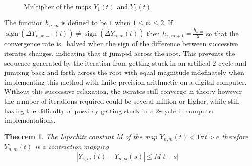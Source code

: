 \documentclass{article}
\newcommand{\tmop}[1]{\ensuremath{\operatorname{#1}}}
\newtheorem{theorem}{Theorem}
\begin{document}
\

\begin{figure}[h]
  \caption{Multiplier of the maps $Y_1 (t)$ and $Y_3 (t)$}
\end{figure}

\begin{remark}
  The function $h_{n, m}$ is defined to be $1$ when $1 \leqslant m \leqslant
  2$. If $\tmop{sign} (\Delta Y^{}_{n, m - 1} (t)) \neq \tmop{sign} (\Delta
  Y^{}_{n, m} (t))$ then $h_{n, m + 1} = \frac{h_{n, m}}{2}$ so that the
  convergence rate is \ halved when the sign of the difference between
  successive iterates changes, indicating that it jumped across the root. This
  prevents the sequence generated by the iteration from getting stuck in an
  artifical $2$-cycle and jumping back and forth across the root with equal
  magnitude indefinately when implementing this method with finite-precision
  arithmetic on a digital computer. Without this successive relaxation, the
  iterates still converge in theory however the number of iterations required
  could be several million or higher, while still having the difficulty of
  possibly getting stuck in a $2$-cycle in computer implementations.
\end{remark}

\begin{theorem}
  \label{cm}The Lipschitz constant $M$ of the map $Y_{n, m} (t) < 1 \forall t
  > e$ therefore $Y_{n, m} (t)$ is a contraction mapping
  \begin{equation}
    | Y_{n, m} (t) - Y_{n, m} (s) | \leqslant M | t - s |
  \end{equation}
\end{theorem}
\end{document}
